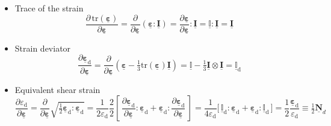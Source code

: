 \documentclass[times,namecite]{goose-article}
\newcommand\T[1]{\underline{\bm{{#1}}}}
\newcommand\TT[1]{\underline{\mathbb{{#1}}}}
\begin{document}
\begin{itemize}
%
\item Trace of the strain
\begin{equation}
  \frac{ \partial \, \mathrm{tr} ( \T{\varepsilon} ) }{ \partial \T{\varepsilon} }
  =
  \frac{ \partial }{ \partial \T{\varepsilon} } \left( \T{\varepsilon} : \T{I} \right)
  =
  \frac{ \partial \T{\varepsilon} }{ \partial \T{\varepsilon} } : \T{I}
  =
  \TT{I} : \T{I}
  =
  \T{I}
\end{equation}
%
\item Strain deviator
\begin{equation}
  \frac{\partial \T{\varepsilon}_\mathrm{d}}{\partial \T{\varepsilon}}
  =
  \frac{ \partial }{ \partial \T{\varepsilon} } \left( \T{\varepsilon} - \tfrac{1}{3} \mathrm{tr} ( \T{\varepsilon} ) \T{I} \right)
  =
  \TT{I} - \tfrac{1}{3} \T{I} \otimes \T{I}
  =
  \TT{I}_\mathrm{d}
\end{equation}
%
\item Equivalent shear strain
\begin{equation}
  \frac{ \partial \varepsilon_\mathrm{d} }{ \partial \T{\varepsilon} }
  =
  \frac{\partial}{\partial \T{\varepsilon}} \sqrt{\tfrac{1}{2} \T{\varepsilon}_\mathrm{d} : \T{\varepsilon}_\mathrm{d}}
  =
  \frac{1}{2 \varepsilon_\mathrm{d}}
  \frac{2}{2}
  \left[\, \frac{\partial \T{\varepsilon}_\mathrm{d}}{\partial \T{\varepsilon}} : \T{\varepsilon}_\mathrm{d} + \T{\varepsilon}_\mathrm{d} : \frac{\partial \T{\varepsilon}_\mathrm{d}}{\partial \T{\varepsilon}} \,\right]
  =
  \frac{1}{4 \varepsilon_\mathrm{d}}
  \big[\, \TT{I}_\mathrm{d} : \T{\varepsilon}_\mathrm{d} + \T{\varepsilon}_\mathrm{d} : \TT{I}_\mathrm{d} \,\big]
  =
  \frac{1}{2}
  \frac{\T{\varepsilon}_\mathrm{d}}{\varepsilon_\mathrm{d}}
  \equiv
  \tfrac{1}{2}
  \T{N}_d
\end{equation}
%
\end{itemize}


\end{document}
